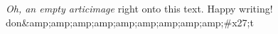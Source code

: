 \textit{Oh, an empty articimage} right onto this text. Happy writing! 
don&amp;amp;amp;amp;amp;amp;amp;amp;amp;#x27;t